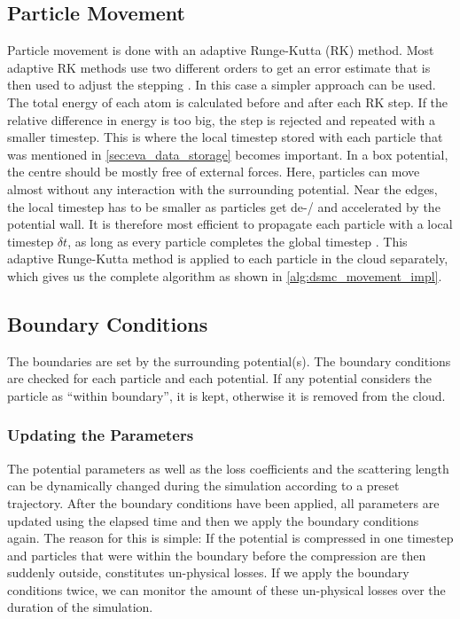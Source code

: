 \subsection{Particle Movement} \label{sec:particlemovement}
Particle movement is done with an adaptive Runge-Kutta (RK) method. Most adaptive RK methods use two different orders to get an error estimate that is then used to adjust the stepping \cite{rungekutta}. In this case a simpler approach can be used. The total energy of each atom is calculated before and after each RK step. If the relative difference in energy is too big, the step is rejected and repeated with a smaller timestep. This is where the local timestep stored with each particle that was mentioned in \cref{sec:eva_data_storage} becomes important. In a box potential, the centre should be mostly free of external forces. Here, particles can move almost without any interaction with the surrounding potential. Near the edges, the local timestep has to be smaller as particles get de-/ and accelerated by the potential wall. It is therefore most efficient to propagate each particle with a local timestep $\delta t$, as long as every particle completes the global timestep \Dt. This adaptive Runge-Kutta method is applied to each particle in the cloud separately, which gives us the complete algorithm as shown in \cref{alg:dsmc_movement_impl}.

\subsection{Boundary Conditions}
The boundaries are set by the surrounding potential(s). The boundary conditions are checked for each particle and each potential. If any potential considers the particle as \enquote{within boundary}, it is kept, otherwise it is removed from the cloud.

\subsubsection*{Updating the Parameters}
The potential parameters as well as the loss coefficients and the scattering length can be dynamically changed during the simulation according to a preset trajectory. After the boundary conditions have been applied, all parameters are updated using the elapsed time and then we apply the boundary conditions again. The reason for this is simple: If the potential is compressed in one timestep and particles that were within the boundary before the compression are then suddenly outside, constitutes un-physical losses. If we apply the boundary conditions twice, we can monitor the amount of these un-physical losses over the duration of the simulation.

